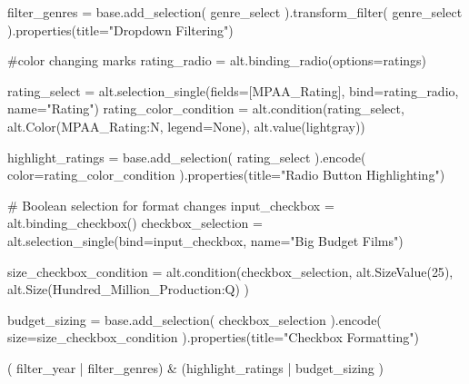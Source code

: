 \documentclass[
  letterpaper,
  DIV=11,
  numbers=noendperiod]{scrartcl}
\newenvironment{Shaded}{\begin{snugshade}}{\end{snugshade}}
\newcommand{\CommentTok}[1]{\textcolor[rgb]{0.37,0.37,0.37}{#1}}
\newcommand{\DecValTok}[1]{\textcolor[rgb]{0.68,0.00,0.00}{#1}}
\newcommand{\NormalTok}[1]{\textcolor[rgb]{0.00,0.23,0.31}{#1}}
\newcommand{\OperatorTok}[1]{\textcolor[rgb]{0.37,0.37,0.37}{#1}}
\newcommand{\StringTok}[1]{\textcolor[rgb]{0.13,0.47,0.30}{#1}}
\newcommand{\VariableTok}[1]{\textcolor[rgb]{0.07,0.07,0.07}{#1}}
\begin{document}
\begin{Shaded}
\begin{Highlighting}[]
\NormalTok{filter\_genres }\OperatorTok{=}\NormalTok{ base.add\_selection(}
\NormalTok{    genre\_select}
\NormalTok{).transform\_filter(}
\NormalTok{    genre\_select}
\NormalTok{).properties(title}\OperatorTok{=}\StringTok{"Dropdown Filtering"}\NormalTok{)}

\CommentTok{\#color changing marks}
\NormalTok{rating\_radio }\OperatorTok{=}\NormalTok{ alt.binding\_radio(options}\OperatorTok{=}\NormalTok{ratings)}

\NormalTok{rating\_select }\OperatorTok{=}\NormalTok{ alt.selection\_single(fields}\OperatorTok{=}\NormalTok{[}\StringTok{\textquotesingle{}MPAA\_Rating\textquotesingle{}}\NormalTok{], bind}\OperatorTok{=}\NormalTok{rating\_radio, name}\OperatorTok{=}\StringTok{"Rating"}\NormalTok{)}
\NormalTok{rating\_color\_condition }\OperatorTok{=}\NormalTok{ alt.condition(rating\_select,}
\NormalTok{                      alt.Color(}\StringTok{\textquotesingle{}MPAA\_Rating:N\textquotesingle{}}\NormalTok{, legend}\OperatorTok{=}\VariableTok{None}\NormalTok{),}
\NormalTok{                      alt.value(}\StringTok{\textquotesingle{}lightgray\textquotesingle{}}\NormalTok{))}

\NormalTok{highlight\_ratings }\OperatorTok{=}\NormalTok{ base.add\_selection(}
\NormalTok{    rating\_select}
\NormalTok{).encode(}
\NormalTok{    color}\OperatorTok{=}\NormalTok{rating\_color\_condition}
\NormalTok{).properties(title}\OperatorTok{=}\StringTok{"Radio Button Highlighting"}\NormalTok{)}

\CommentTok{\# Boolean selection for format changes}
\NormalTok{input\_checkbox }\OperatorTok{=}\NormalTok{ alt.binding\_checkbox()}
\NormalTok{checkbox\_selection }\OperatorTok{=}\NormalTok{ alt.selection\_single(bind}\OperatorTok{=}\NormalTok{input\_checkbox, name}\OperatorTok{=}\StringTok{"Big Budget Films"}\NormalTok{)}

\NormalTok{size\_checkbox\_condition }\OperatorTok{=}\NormalTok{ alt.condition(checkbox\_selection,}
\NormalTok{                                        alt.SizeValue(}\DecValTok{25}\NormalTok{),}
\NormalTok{                                        alt.Size(}\StringTok{\textquotesingle{}Hundred\_Million\_Production:Q\textquotesingle{}}\NormalTok{)}
\NormalTok{                                       )}

\NormalTok{budget\_sizing }\OperatorTok{=}\NormalTok{ base.add\_selection(}
\NormalTok{    checkbox\_selection}
\NormalTok{).encode(}
\NormalTok{    size}\OperatorTok{=}\NormalTok{size\_checkbox\_condition}
\NormalTok{).properties(title}\OperatorTok{=}\StringTok{"Checkbox Formatting"}\NormalTok{)}

\NormalTok{( filter\_year }\OperatorTok{|}\NormalTok{ filter\_genres) }\OperatorTok{\&}\NormalTok{  (highlight\_ratings }\OperatorTok{|}\NormalTok{ budget\_sizing  )}
\end{Highlighting}
\end{Shaded}
\end{document}
